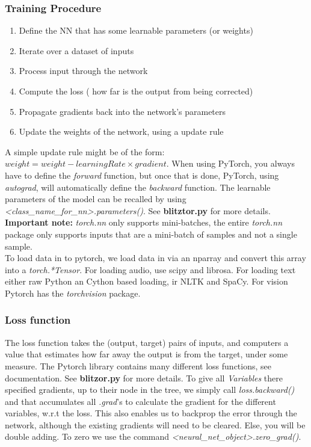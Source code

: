 \documentclass[]{report}
\newcommand{\tif}{\textit}
\newcommand{\tbf}{\textbf}
\begin{document}
\subsubsection{Training Procedure}
\begin{enumerate}
	\item Define the NN that has some learnable parameters (or weights) 
	\item Iterate over a dataset of inputs
	\item Process input through the network
	\item Compute the loss ( how far is the output from being corrected)
	\item Propagate gradients back into the network's parameters
	\item Update the weights of the network, using a update rule
\end{enumerate} 

A simple update rule might be of the form: $weight = weight - learningRate \times gradient$. When using PyTorch, you always have to define the \tif{forward} function, but once that is done, PyTorch, using \tif{autograd}, will automatically define the \tif{backward} function.  The learnable parameters of the model can be recalled by using \textit{<class\_name\_for\_nn>.parameters()}. See \tbf{blitztor.py} for more details.\\

\tbf{Important note: } \tif{torch.nn} only supports mini-batches, the entire \tif{torch.nn} package only supports inputs that are a mini-batch of samples and not a single sample.\\

To load data in to pytorch, we load data in via an nparray and convert this array into a \textit{torch.*Tensor}.
For loading audio, use scipy and librosa. For loading text either raw Python an Cython based loading, ir NLTK and SpaCy. For vision Pytorch has the \tif{torchvision} package.  
  
 
\subsubsection{Loss function}

The loss function takes the (output, target) pairs of inputs, and computers a value that estimates how far away the output is from the target, under some measure. The Pytorch library contains many different loss functions, see documentation. See \tbf{blitzor.py} for more details.
To give all \tif{Variables} there specified gradients, up to their node in the tree, 
we simply call \tif{loss.backward()} and that accumulates all \tif{.grad}'s to calculate the gradient for the different variables, w.r.t the loss.
This also enables us to backprop the error through the network, although the existing gradients will need to be cleared. Else, you will be double adding. To zero we use the command \textit{<neural\_net\_object>.zero\_grad()}.
\end{document}
